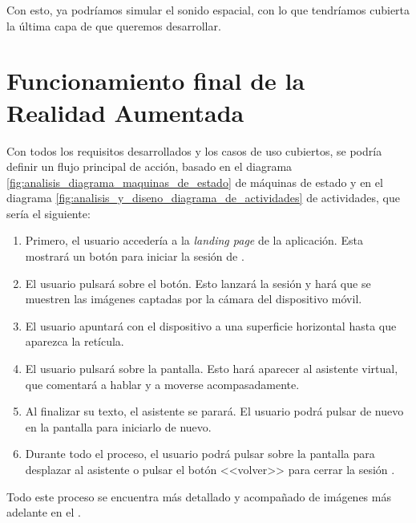 \documentclass{subfiles}
\begin{document}
        Con esto, ya podríamos simular el sonido espacial, con lo que tendríamos cubierta la última capa de \ra que queremos desarrollar.

        \section{Funcionamiento final de la Realidad Aumentada}
        \label{sec:funcionamiento_final_de_la_realidad_aumentada}

        Con todos los requisitos desarrollados y los casos de uso cubiertos, se podría definir un flujo principal de acción, basado en el diagrama \ref{fig:analisis_diagrama_maquinas_de_estado} de máquinas de estado y en el diagrama \ref{fig:analisis_y_diseno_diagrama_de_actividades} de actividades, que sería el siguiente:

        \begin{enumerate}
            \item Primero, el usuario accedería a la \textit{landing page} de la aplicación. Esta mostrará un botón para iniciar la sesión de \ra.
            \item El usuario pulsará sobre el botón. Esto lanzará la sesión y hará que se muestren las imágenes captadas por la cámara del dispositivo móvil.
            \item El usuario apuntará con el dispositivo a una superficie horizontal hasta que aparezca la retícula.
            \item El usuario pulsará sobre la pantalla. Esto hará aparecer al asistente virtual, que comentará a hablar y a moverse acompasadamente.
            \item Al finalizar su texto, el asistente se parará. El usuario podrá pulsar de nuevo en la pantalla para iniciarlo de nuevo.
            \item Durante todo el proceso, el usuario podrá pulsar sobre la pantalla para desplazar al asistente o pulsar el botón <<volver>> para cerrar la sesión \ra.
        \end{enumerate}

        Todo este proceso se encuentra más detallado y acompañado de imágenes más adelante en el .
\end{document}
